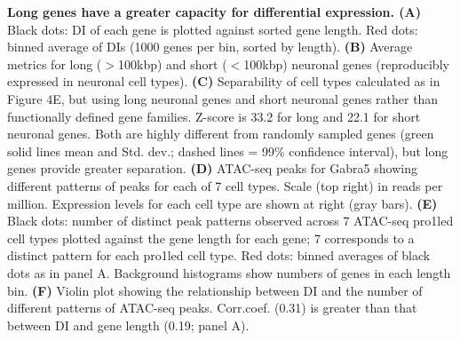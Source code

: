 \textbf{Long genes have a greater capacity for differential expression. (A)} Black dots: DI of each gene is plotted against sorted gene length. Red dots: binned average of DIs (1000 genes per bin, sorted by length). \textbf{(B)} Average metrics for long ($\gt$100kbp) and short ($\lt$100kbp) neuronal genes (reproducibly expressed in neuronal cell types). \textbf{(C)} Separability of cell types calculated as in Figure 4E, but using long neuronal genes and short neuronal genes rather than functionally defined gene families. Z-score is 33.2 for long and 22.1 for short neuronal genes. Both are highly different from randomly sampled genes (green solid lines mean and Std. dev.; dashed lines = 99\% confidence interval), but long genes provide greater separation. \textbf{(D)} ATAC-seq peaks for Gabra5 showing different patterns of peaks for each of 7 cell types. Scale (top right) in reads per million. Expression levels for each cell type are shown at right (gray bars). \textbf{(E)} Black dots: number of distinct peak patterns observed across 7 ATAC-seq pro1led cell types plotted against the gene length for each gene; 7 corresponds to a distinct pattern for each pro1led cell type. Red dots: binned averages of black dots as in panel A. Background histograms show numbers of genes in each length bin. \textbf{(F)} Violin plot showing the relationship between DI and the number of different patterns of ATAC-seq peaks. Corr.coef. (0.31) is greater than that between DI and gene length (0.19; panel A).  